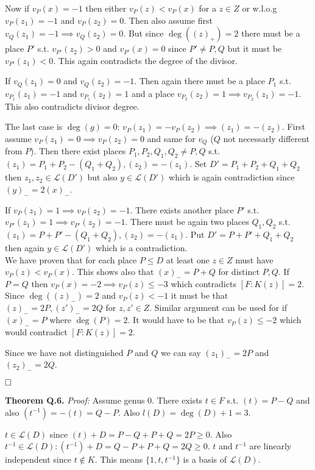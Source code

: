 \documentclass[12pt, a4paper]{article}
\newcommand{\qed}{\hfill\square}
\begin{document}
Now if $v_P(x)=-1$ then either $v_P(z) < v_P(x)$ for a $z \in Z$ or w.l.o.g $v_P(z_1)=-1$ and $v_P(z_2)=0$. Then also assume first $v_Q(z_1)=-1 \implies v_Q(z_2)=0$. But since $\deg((z)_{+})=2$ there must be a place $P'$ s.t. $v_{P'}(z_2)>0$ and $v_{P'}(x)=0$ since $P'\neq P,Q$ but it must be $v_{P'}(z_1) < 0$. This again contradicts the degree of the divisor. 

If $v_Q(z_1)=0$ and $v_Q(z_2)=-1$. Then again there must be a place $P_1$ s.t. $v_{P_1}(z_1)=-1$ and $v_{P_1}(z_2)=1$ and a place $v_{P_2}(z_2)=1 \implies v_{P_2}(z_1)=-1$. This also contradicts divisor degree.

The last case is $\deg(g)=0$: $v_P(z_1)=-v_P(z_2) \implies (z_1) = -(z_2)$. First assume $v_P(z_1)=0 \implies v_P(z_2)=0$ and same for $v_Q$ ($Q$ not necessarly different from $P$). Then there exist places $P_1,P_2,Q_1,Q_2 \neq P,Q$ s.t. $(z_1)=P_1+P_2-(Q_1+Q_2), (z_2)=-(z_1)$. Set $D' = P_1+P_2+Q_1+Q_2$ then $z_1,z_2 \in \mathcal{L}(D')$ but also $y \in \mathcal{L}(D')$ which is again contradiction since $(y)_{-}=2(x)_{-}$.

If $v_P(z_1)=1 \implies v_P(z_2)=-1$. There exists another place $P'$ s.t. $v_{P'}(z_1)=1 \implies v_{P'}(z_2)=-1$. There must be again two places $Q_1,Q_2$ s.t. $(z_1)=P+P'-(Q_1+Q_2), (z_2) = -(z_1)$. Put $D' = P+P'+Q_1+Q_2$ then again $y \in \mathcal{L}(D')$ which is a contradiction.
\\

We have proven that for each place $P \leq D$ at least one $z \in Z$ must have $v_P(z)<v_P(x)$. This shows also that $(x)_{-}=P+Q$ for distinct $P,Q$. If $P=Q$ then $v_P(x)=-2 \implies v_P(z)\leq -3$ which contradicts $[F:K(z)]=2$. Since $\deg((z)_{-})=2$ and $v_P(z) < -1$ it must be that $(z)_{-}=2P, (z')_{-}=2Q$ for $z,z' \in Z$. Similar argument can be used for if $(x)_{-} = P$ where $\deg(P)=2$. It would have to be that $v_P(z) \leq -2$ which would contradict $[F:K(z)]=2$.

Since we have not distinguished $P$ and $Q$ we can say $(z_1)_{-}=2P$ and $(z_2)_{-}=2Q$.



$\qed$


\textbf{Theorem Q.6.} \textit{Proof:}
Assume genus 0. There exists $t \in F$ s.t. $(t)=P-Q$ and also $(t^{-1})=-(t)=Q-P$. Also $l(D)=\deg(D)+1 = 3$. 

$t \in \mathcal{L}(D)$ since $(t)+D = P-Q+P+Q=2P \geq 0$. Also $t^{-1} \in \mathcal{L}(D): (t^{-1})+D=Q-P+P+Q = 2Q \geq 0$. $t$ and $t^{-1}$ are linearly independent since $t \notin K$. This means $\{1,t,t^{-1}\}$ is a basis of $\mathcal{L}(D)$.
\end{document}
